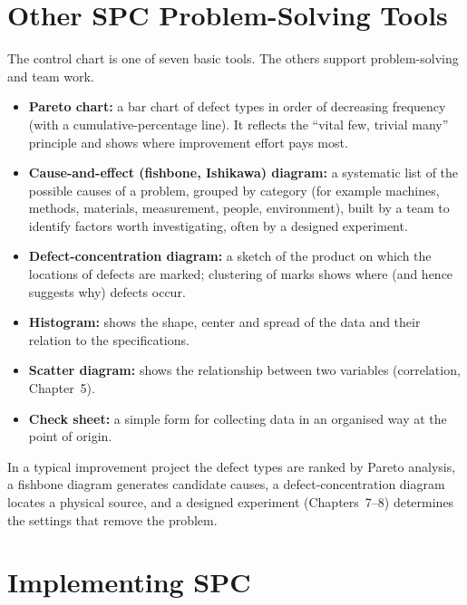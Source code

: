 \section{Other SPC Problem-Solving Tools}

The control chart is one of seven basic tools. The others support problem-solving and team work.
\begin{itemize}
  \item \textbf{Pareto chart:} a bar chart of defect types in order of decreasing frequency (with a cumulative-percentage line). It reflects the ``vital few, trivial many'' principle and shows where improvement effort pays most.
  \item \textbf{Cause-and-effect (fishbone, Ishikawa) diagram:} a systematic list of the possible causes of a problem, grouped by category (for example machines, methods, materials, measurement, people, environment), built by a team to identify factors worth investigating, often by a designed experiment.
  \item \textbf{Defect-concentration diagram:} a sketch of the product on which the locations of defects are marked; clustering of marks shows where (and hence suggests why) defects occur.
  \item \textbf{Histogram:} shows the shape, center and spread of the data and their relation to the specifications.
  \item \textbf{Scatter diagram:} shows the relationship between two variables (correlation, Chapter~5).
  \item \textbf{Check sheet:} a simple form for collecting data in an organised way at the point of origin.
\end{itemize}
In a typical improvement project the defect types are ranked by Pareto analysis, a fishbone diagram generates candidate causes, a defect-concentration diagram locates a physical source, and a designed experiment (Chapters~7--8) determines the settings that remove the problem.

\section{Implementing SPC}

